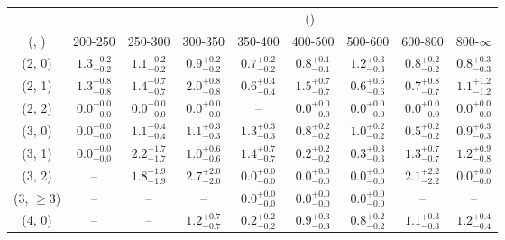 \begin{table}[h!]
\tiny
\centering
{}
\begin{tabular}
{ccccccccc}
	\hline\hline
&	& \multicolumn{8}{c}{\scalht (\gev)} \\ 
	 (\njet,  \nb) & 200-250 & 250-300 & 300-350 & 350-400 & 400-500 & 500-600 & 600-800 & 800-$\infty$ \\ [0.8ex] 
\hline
	(2, 0) & $1.3^{+ 0.2 }_{- 0.2 }$ & $1.1^{+ 0.2 }_{- 0.2 }$ & $0.9^{+ 0.2 }_{- 0.2 }$ & $0.7^{+ 0.2 }_{- 0.2 }$ & $0.8^{+ 0.1 }_{- 0.1 }$ & $1.2^{+ 0.3 }_{- 0.3 }$ & $0.8^{+ 0.2 }_{- 0.2 }$ & $0.8^{+ 0.3 }_{- 0.3 }$ \\[0.5ex] 
	(2, 1) & $1.3^{+ 0.8 }_{- 0.8 }$ & $1.4^{+ 0.7 }_{- 0.7 }$ & $2.0^{+ 0.8 }_{- 0.8 }$ & $0.6^{+ 0.4 }_{- 0.4 }$ & $1.5^{+ 0.7 }_{- 0.7 }$ & $0.6^{+ 0.6 }_{- 0.6 }$ & $0.7^{+ 0.8 }_{- 0.7 }$ & $1.1^{+ 1.2 }_{- 1.2 }$ \\[0.5ex] 
	(2, 2) & $0.0^{+ 0.0 }_{- 0.0 }$ & $0.0^{+ 0.0 }_{- 0.0 }$ & $0.0^{+ 0.0 }_{- 0.0 }$ & -- & $0.0^{+ 0.0 }_{- 0.0 }$ & $0.0^{+ 0.0 }_{- 0.0 }$ & $0.0^{+ 0.0 }_{- 0.0 }$ & $0.0^{+ 0.0 }_{- 0.0 }$ \\[0.5ex] 
	(3, 0) & $0.0^{+ 0.0 }_{- 0.0 }$ & $1.1^{+ 0.4 }_{- 0.4 }$ & $1.1^{+ 0.3 }_{- 0.3 }$ & $1.3^{+ 0.3 }_{- 0.3 }$ & $0.8^{+ 0.2 }_{- 0.2 }$ & $1.0^{+ 0.2 }_{- 0.2 }$ & $0.5^{+ 0.2 }_{- 0.2 }$ & $0.9^{+ 0.3 }_{- 0.3 }$ \\[0.5ex] 
	(3, 1) & $0.0^{+ 0.0 }_{- 0.0 }$ & $2.2^{+ 1.7 }_{- 1.7 }$ & $1.0^{+ 0.6 }_{- 0.6 }$ & $1.4^{+ 0.7 }_{- 0.7 }$ & $0.2^{+ 0.2 }_{- 0.2 }$ & $0.3^{+ 0.3 }_{- 0.3 }$ & $1.3^{+ 0.7 }_{- 0.7 }$ & $1.2^{+ 0.9 }_{- 0.8 }$ \\[0.5ex] 
	(3, 2) & -- & $1.8^{+ 1.9 }_{- 1.9 }$ & $2.7^{+ 2.0 }_{- 2.0 }$ & $0.0^{+ 0.0 }_{- 0.0 }$ & $0.0^{+ 0.0 }_{- 0.0 }$ & $0.0^{+ 0.0 }_{- 0.0 }$ & $2.1^{+ 2.2 }_{- 2.2 }$ & $0.0^{+ 0.0 }_{- 0.0 }$ \\[0.5ex] 
	(3, $\ge3$) & -- & -- & -- & $0.0^{+ 0.0 }_{- 0.0 }$ & $0.0^{+ 0.0 }_{- 0.0 }$ & $0.0^{+ 0.0 }_{- 0.0 }$ & -- & -- \\[0.5ex] 
	(4, 0) & -- & -- & $1.2^{+ 0.7 }_{- 0.7 }$ & $0.2^{+ 0.2 }_{- 0.2 }$ & $0.9^{+ 0.3 }_{- 0.3 }$ & $0.8^{+ 0.2 }_{- 0.2 }$ & $1.1^{+ 0.3 }_{- 0.3 }$ & $1.2^{+ 0.4 }_{- 0.4 }$ \\[0.5ex] 

\end{tabular}
\end{table}
